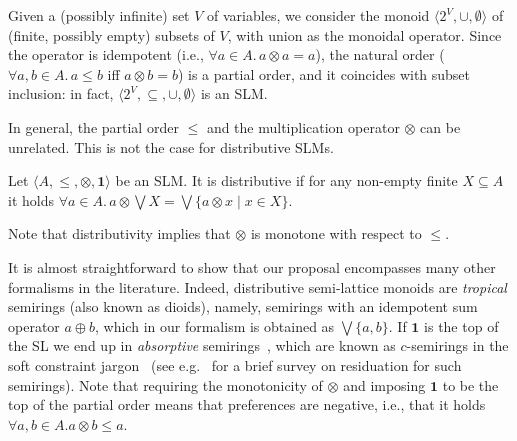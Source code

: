 \documentclass{llncs}
\def\monid{{\mathbf 0}}
\def\monop{\otimes}
\def\monid{\mathbf{1}}
\begin{document}
\begin{example}\label{ex:powerset}
	Given a (possibly infinite) set $V$ of variables, we consider
	the monoid $\langle 2^V, \cup, \emptyset \rangle$
	of (finite, possibly empty) subsets of $V$, with union as the monoidal operator.
	Since the operator is idempotent (i.e., $\forall a\in A.\, a \monop a = a$), 
	the natural order ($\forall a, b \in A.\, a \leq b$ iff $a \monop b = b$) 
	is a partial order, and 
	it coincides with subset inclusion:
	in fact, $\langle 2^V, \subseteq, \cup, \emptyset \rangle$
	is an SLM.
\end{example}

In general, the partial order $\leq$ and the multiplication operator $\otimes$ can be unrelated.
This is not the case for distributive SLMs.

\begin{definition}[distributivity]
\label{dist}
Let $\langle A, \leq, \monop, \monid \rangle$ be an SLM.
It is distributive if
	for  any  non-empty finite  $X \subseteq A$
		it holds $\forall a \in A.\,  a \monop  \bigvee X = \bigvee \{a \monop x \mid x \in X\}$.
\end{definition}

Note that distributivity implies that $\otimes$ is monotone with respect to $\leq$.
\begin{remark}

	It is almost straightforward to show that our proposal encompasses many other formalisms in the literature.
	Indeed, distributive semi-lattice monoids are \emph{tropical} semirings (also known as dioids), 
	namely, semirings with an idempotent sum operator $a \oplus b$, which in our formalism is obtained as
	$\bigvee \{a, b\}$.
	If $\monid$ is the top of the SL we end up 
	in \emph{absorptive} semirings~\cite{golanShort}, 
	which are known as $c$-semirings 
	in the soft constraint jargon~\cite{jacm97} (see e.g.~\cite{ecai06} for a brief survey on residuation 
	for such semirings).
	Note that requiring the monotonicity of $\otimes$ and imposing $\monid$ to be the top of the partial order
	means that preferences are negative, i.e., 
	that it holds $\forall a, b \in A. a \monop b \leq a$.
\end{remark}
\end{document}
